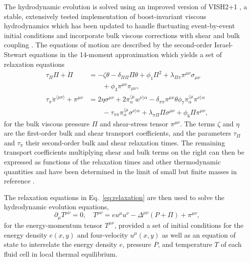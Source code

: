 \documentclass[aps,prc,reprint,amsmath,nofootinbib,superscriptaddress]{revtex4-1}
\begin{document}
The hydrodynamic evolution is solved using an improved version of VISH2+1 \cite{Song:2007ux}, a stable, extensively tested implementation of boost-invariant viscous hydrodynamics which has been updated to handle fluctuating event-by-event initial conditions \cite{Shen:2014vra} and incorporate bulk viscous corrections with shear and bulk coupling \cite{Denicol:2014vaa}.
The equations of motion are described by the second-order Israel-Stewart equations in the 14-moment approximation \cite{Israel:1979wp,Israel:1976aa} which yields a set of relaxation equations
\begin{subequations}
  \begin{align}
    \tau_\Pi \Pi + \dot{\Pi} &=
      -\zeta \theta - \delta_{\Pi\Pi} \Pi\theta + \phi_1 \Pi^2
      + \lambda_{\Pi\pi} \pi^{\mu\nu} \sigma_{\mu\nu} \nonumber \\
      &\qquad + \phi_3 \pi^{\mu\nu}\pi_{\mu\nu}, \\
    \tau_\pi \dot{\pi}^{\langle \mu\nu \rangle} + \pi^{\mu\nu} &=
      2\eta\sigma^{\mu\nu} + 2\pi_\alpha^{\langle \mu} w^{\nu \rangle \alpha}
      - \delta_{\pi\pi} \pi^{\mu\nu} \theta \phi_7 \pi_\alpha^{\langle \mu}
        \pi^{\nu \rangle \alpha} \nonumber \\
      &\qquad - \tau_{\pi\pi} \pi_\alpha^{\langle \mu}\sigma^{\nu \rangle \alpha}
      + \lambda_{\pi\Pi} \Pi \sigma^{\mu\nu} + \phi_6 \Pi \pi^{\mu\nu},
  \end{align}
  \label{eq:relaxation}
\end{subequations}
for the bulk viscous pressure $\Pi$ and shear-stress tensor $\pi^{\mu\nu}$.
The terms $\zeta$ and $\eta$ are the first-order bulk and shear transport coefficients, and the parameters $\tau_\Pi$ and $\tau_\pi$ their second-order bulk and shear relaxation times.
The remaining transport coefficients multiplying shear and bulk terms on the right can then be expressed as functions of the relaxation times and other thermodynamic quantities and have been determined in the limit of small but finite masses in reference \cite{Denicol:2014vaa}.

The relaxation equations in Eq.~\eqref{eq:relaxation} are then used to solve the hydrodynamic evolution equations,
\begin{equation}
  \partial_\mu T^{\mu\nu} = 0, \quad T^{\mu\nu} = e u^\mu u^\nu  - \Delta^{\mu\nu} (P + \Pi) + \pi^{\mu\nu},
  \label{eq:conservation}
\end{equation}
for the energy-momentum tensor $T^{\mu\nu}$, provided a set of initial conditions for the energy density $e(x,y)$ and four-velocity $u^\mu(x,y)$ as well as an equation of state to interrelate the energy density $e$, pressure $P$, and temperature $T$ of each fluid cell in local thermal equilibrium.
\end{document}
